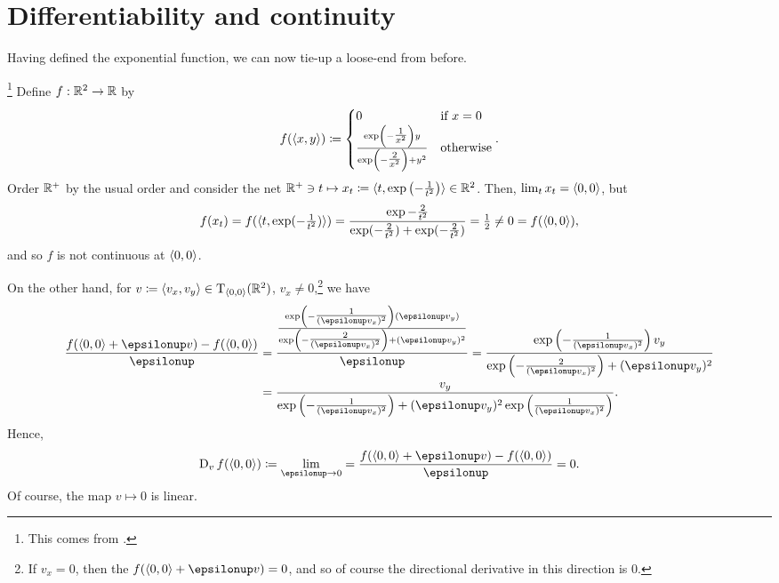 \section{Differentiability and continuity}


Having defined the exponential function, we can now tie-up a loose-end from before.
\begin{exm}\footnote{This comes from \cite[pg.~116]{Gelbaum}.}\label{exm6.2.15}
Define $f:\R ^2\rightarrow \R$ by
\begin{equation}
f(\coord{x,y})\coloneqq \begin{cases}0 & \text{if }x=0 \\ \frac{\exp \left( -\tfrac{1}{x^2}\right) y}{\exp \left( -\tfrac{2}{x^2}\right) +y^2} & \text{otherwise}\end{cases}.
\end{equation}
Order $\R ^+$ by the usual order and consider the net $\R ^+\ni t\mapsto x_t\coloneqq \coord{t,\exp \left( -\frac{1}{t^2}\right) }\in \R ^2$.  Then, $\lim _tx_t=\coord{0,0}$, but
\begin{equation}
f(x_t)=f(\coord{t,\exp (-\tfrac{1}{t^2})})=\frac{\exp{-\tfrac{2}{t^2}}}{\exp (-\tfrac{2}{t^2})+\exp (-\tfrac{2}{t^2})}=\tfrac{1}{2}\neq 0=f(\coord{0,0}),
\end{equation}
and so $f$ is not continuous at $\coord{0,0}$.

On the other hand, for $v\coloneqq \coord{v_x,v_y}\in \tangent{\R ^2}{\coord{0,0}}$, $v_x\neq 0$,\footnote{If $v_x=0$, then the $f(\coord{0,0}+\epsilon v)=0$, and so of course the directional derivative in this direction is $0$.} we have
\begin{equation}
\begin{split}
\frac{f(\coord{0,0}+\epsilon v)-f(\coord{0,0})}{\epsilon} & =\frac{\frac{\exp \left( -\tfrac{1}{(\epsilon v_x)^2}\right) (\epsilon v_y)}{\exp \left(-\tfrac{2}{(\epsilon v_x)^2}\right) +(\epsilon v_y)^2}}{\epsilon}=\frac{\exp \left( -\tfrac{1}{(\epsilon v_x)^2}\right) v_y}{\exp \left( -\tfrac{2}{(\epsilon v_x)^2}\right) +(\epsilon v_y)^2} \\
& =\frac{v_y}{\exp \left( -\tfrac{1}{(\epsilon v_x)^2}\right) +(\epsilon v_y)^2\exp \left( \tfrac{1}{(\epsilon v_x)^2}\right) }.
\end{split}
\end{equation}
Hence,
\begin{equation}
\D _vf(\coord{0,0})\coloneqq \lim _{\epsilon \to 0}=\frac{f(\coord{0,0}+\epsilon v)-f(\coord{0,0})}{\epsilon}=0.
\end{equation}
Of course, the map $v\mapsto 0$ is linear.


\end{exm}
